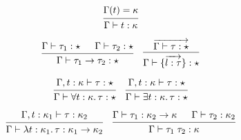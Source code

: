 \documentclass[lualatex,12pt,unicode]{article}
\begin{document}
\pagestyle{empty}

\[
    \begin{prooftree}
        \hypo{\Gamma(t) = \kappa}
        \infer1{\Gamma \vdash t: \kappa}
    \end{prooftree}
\]

\[
    \begin{prooftree}
        \hypo{\Gamma \vdash \tau_1: \star}
        \hypo{\Gamma \vdash \tau_2: \star}
        \infer2{\Gamma \vdash \tau_1 \to \tau_2: \star}
    \end{prooftree}
    \hspace{1em}
    \begin{prooftree}
        \hypo{\overrightarrow{\Gamma \vdash \tau: \star}}
        \infer1{\Gamma \vdash \{\overrightarrow{l: \tau}\}: \star}
    \end{prooftree}
\]

\[
    \begin{prooftree}
        \hypo{\Gamma, t: \kappa \vdash \tau: \star}
        \infer1{\Gamma \vdash \forall t: \kappa\ldotp \tau: \star}
    \end{prooftree}
    \hspace{1em}
    \begin{prooftree}
        \hypo{\Gamma, t: \kappa \vdash \tau: \star}
        \infer1{\Gamma \vdash \exists t: \kappa\ldotp \tau: \star}
    \end{prooftree}
\]

\[
    \begin{prooftree}
        \hypo{\Gamma, t: \kappa_1 \vdash \tau: \kappa_2}
        \infer1{\Gamma \vdash \lambda t: \kappa_1\ldotp \tau: \kappa_1 \to \kappa_2}
    \end{prooftree}
    \hspace{1em}
    \begin{prooftree}
        \hypo{\Gamma \vdash \tau_1: \kappa_2 \to \kappa}
        \hypo{\Gamma \vdash \tau_2: \kappa_2}
        \infer2{\Gamma \vdash \tau_1\; \tau_2: \kappa}
    \end{prooftree}
\]
\end{document}

